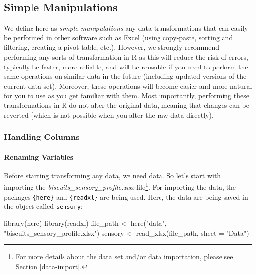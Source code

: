 \documentclass[
]{krantz}
\makeatletter
\newenvironment{Shaded}{\begin{snugshade}}{\end{snugshade}}
\newcommand{\AttributeTok}[1]{\textcolor[rgb]{0.61,0.61,0.61}{#1}}
\newcommand{\FunctionTok}[1]{\textcolor[rgb]{0,0,0}{#1}}
\newcommand{\NormalTok}[1]{#1}
\newcommand{\OtherTok}[1]{\textcolor[rgb]{0.37,0.37,0.37}{#1}}
\newcommand{\StringTok}[1]{\textcolor[rgb]{0.5,0.5,0.5}{#1}}
\newenvironment{kframe}{%
\medskip{}
\setlength{\fboxsep}{.8em}
 \def\at@end@of@kframe{}%
 \ifinner\ifhmode%
  \def\at@end@of@kframe{\end{minipage}}%
  \begin{minipage}{\columnwidth}%
 \fi\fi%
 \def\FrameCommand##1{\hskip\@totalleftmargin \hskip-\fboxsep
 \colorbox{shadecolor}{##1}\hskip-\fboxsep
     \hskip-\linewidth \hskip-\@totalleftmargin \hskip\columnwidth}%
 \MakeFramed {\advance\hsize-\width
   \@totalleftmargin\z@ \linewidth\hsize
   \@setminipage}}%
 {\par\unskip\endMakeFramed%
 \at@end@of@kframe}
\renewenvironment{Shaded}{\begin{kframe}}{\end{kframe}}
\makeatother
\begin{document}
\hypertarget{simple_manips}{%
\subsection{Simple Manipulations}\label{simple_manips}}

We define here as \emph{simple manipulations} any data transformations that can easily be performed in other software such as Excel (using copy-paste, sorting and filtering, creating a pivot table, etc.). However, we strongly recommend performing any sorts of transformation in R as this will reduce the risk of errors, typically be faster, more reliable, and will be reusable if you need to perform the same operations on similar data in the future (including updated versions of the current data set). Moreover, these operations will become easier and more natural for you to use as you get familiar with them. Most importantly, performing these transformations in R do not alter the original data, meaning that changes can be reverted (which is not possible when you alter the raw data directly).

\hypertarget{handling-columns}{%
\subsubsection{Handling Columns}\label{handling-columns}}

\hypertarget{renaming}{%
\paragraph*{Renaming Variables}\label{renaming}}

Before starting transforming any data, we need data. So let's start with importing the \emph{biscuits\_sensory\_profile.xlsx} file\footnote{For more details about the data set and/or data importation, please see Section \ref{data-import}.}. For importing the data, the packages \texttt{\{here\}} and \texttt{\{readxl\}} are being used. Here, the data are being saved in the object called \texttt{sensory}:

\begin{Shaded}
\begin{Highlighting}[]
\FunctionTok{library}\NormalTok{(here)}
\FunctionTok{library}\NormalTok{(readxl)}
\NormalTok{file\_path }\OtherTok{\textless{}{-}} \FunctionTok{here}\NormalTok{(}\StringTok{"data"}\NormalTok{, }\StringTok{"biscuits\_sensory\_profile.xlsx"}\NormalTok{)}
\NormalTok{sensory }\OtherTok{\textless{}{-}} \FunctionTok{read\_xlsx}\NormalTok{(file\_path, }\AttributeTok{sheet =} \StringTok{"Data"}\NormalTok{)}
\end{Highlighting}
\end{Shaded}
\end{document}
